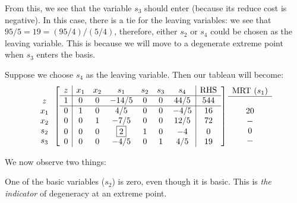 \begin{example}
From this, we see that the variable $s_3$ should enter (because its reduce cost is negative). In this case, there is a tie for the leaving variables: we see that $95/5 = 19 = (95/4)/(5/4)$, therefore, either $s_2$ or $s_4$ could be chosen as the leaving variable. This is because we will move to a degenerate extreme point when $s_3$ enters the basis. 

Suppose we choose $s_4$ as the leaving variable. Then our tableau will become:
\begin{equation}
\begin{array}{c}
\\
z\\
x_1\\
x_2\\
s_2\\
s_3
\end{array}
\left[
\begin{array}{c|cccccc|c}
z& x_1 & x_2 & s_1 & s_2 & s_3 & s_4 &\text{RHS}\\
\hline
1 & 0 & 0 & -14/5 & 0 & 0 & 44/5 & 544\\
\hline
0 & 1 & 0 & 4/5 			& 0 & 0  & -4/5 & 16\\
0 & 0 & 1 & -7/5 			& 0 & 0  & 12/5 & 72\\
0 & 0 & 0 & \fbox{2} 		& 1 & 0  & -4 	& 0\\
0 & 0 & 0 & -4/5 			& 0 & 1  & 4/5 	& 19
\end{array}\right]
\begin{array}{c}
\text{MRT ($s_1$)}\\
\hline
\\
20\\
-\\
0\\
-
\end{array}
\end{equation}

We now observe two things: 
\begin{enumerate*}
\item One of the basic variables ($s_2$) is zero, even though it is basic. This is \textit{the indicator} of degeneracy at an extreme point. 


\end{enumerate*}
\end{example}
